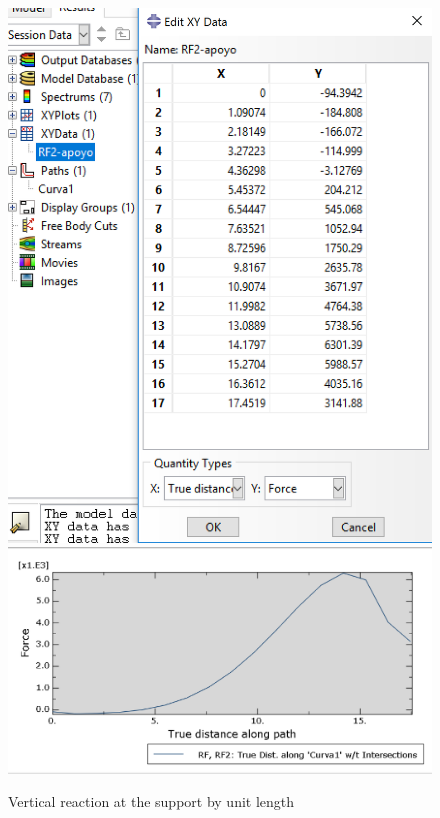 \documentclass[english,a4paper,12pt]{article}
\begin{document}
\begin{enumerate}
\begin{figure}[!htp]
\centering
\includegraphics[scale=0.35]{capturas2019/a_fig41p2a.png}
\quad
\includegraphics[scale=0.35]{capturas2019/a_fig41p2.png}
\caption{Vertical reaction at the support by unit length}
  \label{fig28}
\end{figure}
\end{enumerate}
\end{document}
